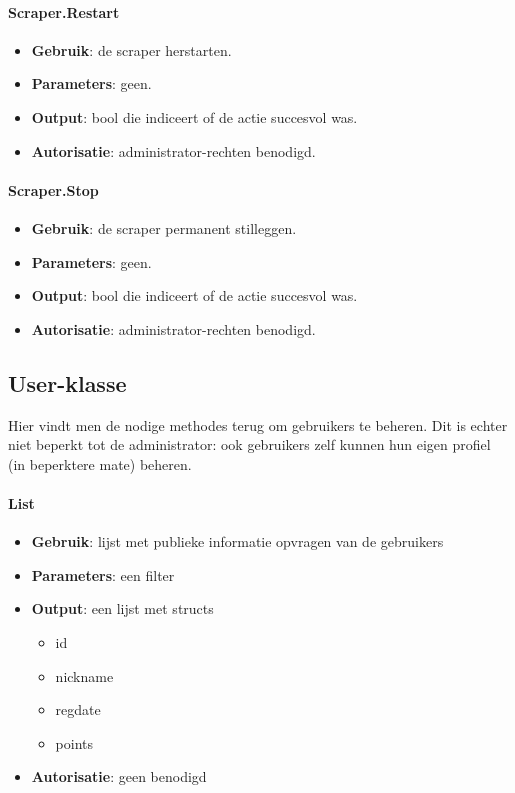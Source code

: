 \paragraph{Scraper.Restart}
\begin{itemize}
\item{\textbf{Gebruik}: de scraper herstarten.}
\item{\textbf{Parameters}: geen.}
\item{\textbf{Output}: bool die indiceert of de actie succesvol was.}
\item{\textbf{Autorisatie}: administrator-rechten benodigd.}
\end{itemize}

\paragraph{Scraper.Stop}
\begin{itemize}
\item{\textbf{Gebruik}: de scraper permanent stilleggen.}
\item{\textbf{Parameters}: geen.}
\item{\textbf{Output}: bool die indiceert of de actie succesvol was.}
\item{\textbf{Autorisatie}: administrator-rechten benodigd.}
\end{itemize}


\subsection{User-klasse}

Hier vindt men de nodige methodes terug om gebruikers te beheren. Dit is echter niet beperkt tot de administrator: ook gebruikers zelf kunnen hun eigen profiel (in beperktere mate) beheren.

\paragraph{List}

\begin{itemize}
\item{\textbf{Gebruik}: lijst met publieke informatie opvragen van de gebruikers}
\item{\textbf{Parameters}: een filter}
\item{\textbf{Output}: een lijst met structs}
	\begin{itemize}
	\item{id}
	\item{nickname}
	\item{regdate}
	\item{points}
	\end{itemize}
\item{\textbf{Autorisatie}: geen benodigd}
\end{itemize}

